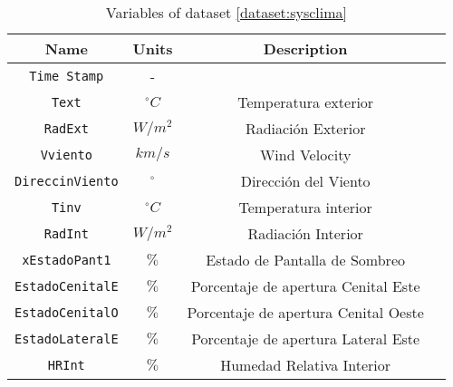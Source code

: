 \begin{table}[ht!]
    \centering
    \begin{tabular}{|c|c|c|c|}
        \hline
        \textbf{Name}           & \textbf{Units} & \textbf{Description}         \\ 
        \hline
        \texttt{Time Stamp}         & -              &                              \\ \hline
        \texttt{Text}               & $^\circ C$     & Temperatura exterior         \\ \hline
        \texttt{RadExt}             & $W/m^2$        & Radiación Exterior           \\ \hline
        \texttt{Vviento}            & $km/s$         & Wind Velocity                \\  \hline
        \texttt{DireccinViento}     & $^\circ$       & Dirección del Viento         \\ \hline
        \texttt{Tinv}               & $^\circ C$     & Temperatura interior         \\ \hline
        \texttt{RadInt}             & $W/m^2$        & Radiación Interior               \\ \hline
        \texttt{xEstadoPant1}       & $\%$           & Estado de Pantalla de Sombreo    \\ \hline
        \texttt{EstadoCenitalE}     & $\%$           & Porcentaje de apertura Cenital Este      \\ \hline
        \texttt{EstadoCenitalO}     & $\%$           & Porcentaje de apertura Cenital Oeste     \\ \hline
        \texttt{EstadoLateralE}     & $\%$           & Porcentaje de apertura Lateral Este      \\ \hline
        \texttt{HRInt}              & $\%$           & Humedad Relativa Interior                             \\ 
        \hline
    \end{tabular}
    \caption{Variables of dataset \ref{dataset:sysclima}}
    \label{table:SysClimaSimply}
\end{table}
